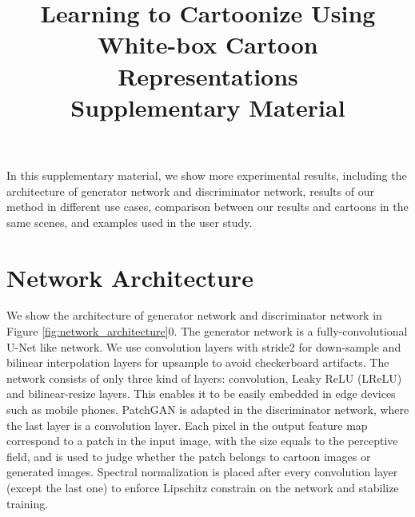 \documentclass[10pt,twocolumn,letterpaper]{article}
\begin{document}



\title{Learning to Cartoonize Using White-box Cartoon Representations\\Supplementary Material}



In this supplementary material, we show more experimental results, including the architecture of generator network and discriminator network, results of our method in different use cases, comparison between our results and cartoons in the same scenes, and examples used in the user study.

\vspace{-0.3em}
\section{Network Architecture}
\vspace{-0.3em}
We show the architecture of generator network and discriminator network in Figure \ref{fig:network_architecture}0. The generator network is a fully-convolutional U-Net \cite{ronneberger2015u} like network. We use convolution layers with stride2 for down-sample and bilinear interpolation layers for upsample to avoid checkerboard artifacts. The network consists of only three kind of layers: convolution,  Leaky ReLU (LReLU) \cite{maas2013rectifier} and bilinear-resize layers. This enables it to be easily embedded in edge devices such as mobile phones. PatchGAN \cite{isola2017image} is adapted in the discriminator network, where the last layer is a convolution layer. Each pixel in the output feature map correspond to a patch in the input image, with the size equals to the perceptive field, and is used to judge whether the patch belongs to cartoon images or generated images. Spectral normalization \cite{miyato2018spectral} is placed after every convolution layer (except the last one) to enforce Lipschitz constrain on the network and stabilize training. 
\end{document}
